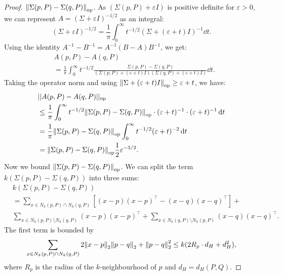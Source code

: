 \begin{proof}
    $\norm{\Sigma(p, P) - \Sigma(q, P)}_{\mathrm{op}}$.
    As $(\Sigma(p, P) + \varepsilon I)$ is positive definite for $\varepsilon > 0$,
    we can represent $A = (\Sigma + \varepsilon I)^{-1/2}$ as an integral:
    \begin{equation}
        (\Sigma + \varepsilon I)^{-1/2} = \frac{1}{\pi} \int_0^\infty t^{-1/2} (\Sigma + (\varepsilon + t)I)^{-1} \dd{t}.
    \end{equation}
    Using the identity $A^{-1} - B^{-1} = A^{-1}(B - A)B^{-1}$, we get:
    \begin{align}
        & A(p, P) - A(q, P) \nonumber \\
        & = \frac{1}{\pi} \int_0^\infty t^{-1/2} \frac{\Sigma(p, P) - \Sigma(q, P)}{(\Sigma(p, P) + (\varepsilon + t)I) (\Sigma(q, P) + (\varepsilon + t)I)} \dd{t}.
    \end{align}
    Taking the operator norm and using $\norm{\Sigma + (\varepsilon + t)I}_{\mathrm{op}} \geq \varepsilon + t$, we have:
    \begin{align}
        & ||A(p, P) - A(q, P)||_{\mathrm{op}} \nonumber \\
        & \leq \frac{1}{\pi} \int_0^\infty t^{-1/2} \norm{\Sigma(p, P) - \Sigma(q, P)}_{\mathrm{op}} \cdot (\varepsilon + t)^{-1} \cdot (\varepsilon + t)^{-1} \dd{t} \\
        & = \frac{1}{\pi} \norm{\Sigma(p, P) - \Sigma(q, P)}_{\mathrm{op}} \int_0^\infty t^{-1/2} (\varepsilon + t)^{-2} \dd{t} \\
        & = \norm{\Sigma(p, P) - \Sigma(q, P)}_{\mathrm{op}} \frac{1}{2} \varepsilon^{-3/2}.
    \end{align}
    Now we bound $\norm{\Sigma(p, P) - \Sigma(q, P)}_{\mathrm{op}}$.
    We can split the term $k(\Sigma(p, P) - \Sigma(q, P))$ into three sums:
    \begin{align}
        & k(\Sigma(p, P) - \Sigma(q, P)) \nonumber \\
        & = \sum_{x \in N_k(p, P) \cap N_k(q, P)}[(x - p)(x - p)^\top - (x - q)(x - q)^\top] + \nonumber \\
        & \sum_{x \in N_k(p, P) \setminus N_k(q, P)} (x - p)(x - p)^\top +
        \sum_{x \in N_k(q, P) \setminus N_k(p, P)} (x - q)(x - q)^\top.
    \end{align}
    The first term is bounded by
    \begin{equation}
        \sum_{x \in N_k(p, P) \cap N_k(q, P)} 2\norm{x - p}_2 \norm{p - q}_2 + \norm{p - q}_2^2 \leq k(2R_p \cdot d_H + d_H^2),
    \end{equation}
    where $R_p$ is the radius of the $k$-neighbourhood of $p$ and $d_H = d_H(P, Q)$.
    

\end{proof}
